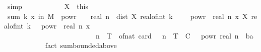 \begin{isabellebody}
\ simp\isanewline
\ \ \ \ \ \ \ \ \isacommand{{\isacharbraceright}{\kern0pt}}\isamarkupfalse%
\ \isamarkupfalse%
\ X\ {\isacharequal}{\kern0pt}\ this\isanewline
\ \ \ \ \ \ \ \ \isamarkupfalse%
\ \isamarkupfalse%
\ {\isachardoublequoteopen}sum\ {\isacharparenleft}{\kern0pt}{\isasymlambda}k{\isachardot}{\kern0pt}\ {\isasymP}{\isacharparenleft}{\kern0pt}x\ in\ {\isacharquery}{\kern0pt}M{\isachardot}{\kern0pt}\ {}\ powr\ {\isacharparenleft}{\kern0pt}{\isacharminus}{\kern0pt}\ {\isasymgamma}\ {\isacharasterisk}{\kern0pt}\ real\ n{\isacharparenright}{\kern0pt}\ {\isasymle}\ dist\ {\isacharparenleft}{\kern0pt}X\ {\isacharparenleft}{\kern0pt}real{\isacharunderscore}{\kern0pt}of{\isacharunderscore}{\kern0pt}int\ {\isacharparenleft}{\kern0pt}k\ {\isacharminus}{\kern0pt}\ {}{\isacharparenright}{\kern0pt}\ {\isacharasterisk}{\kern0pt}\ {}\ powr\ {\isacharminus}{\kern0pt}\ real\ n{\isacharparenright}{\kern0pt}\ x{\isacharparenright}{\kern0pt}\ {\isacharparenleft}{\kern0pt}X\ {\isacharparenleft}{\kern0pt}real{\isacharunderscore}{\kern0pt}of{\isacharunderscore}{\kern0pt}int\ k\ {\isacharasterisk}{\kern0pt}\ {}\ powr\ {\isacharminus}{\kern0pt}\ real\ n{\isacharparenright}{\kern0pt}\ x{\isacharparenright}{\kern0pt}{\isacharparenright}{\kern0pt}{\isacharparenright}{\kern0pt}\ \isanewline
\ \ \ \ \ \ \ \ \ \ \ \ \ \ \ \ \ \ \ \ \ \ \ \ {\isacharbraceleft}{\kern0pt}{}{\isachardot}{\kern0pt}{\isachardot}{\kern0pt}{\isasymlfloor}{}\ {\isacharcircum}{\kern0pt}\ n\ {\isacharasterisk}{\kern0pt}\ T{\isasymrfloor}{\isacharbraceright}{\kern0pt}\ {\isasymle}\ of{\isacharunderscore}{\kern0pt}nat\ {\isacharparenleft}{\kern0pt}card\ {\isacharbraceleft}{\kern0pt}{}{\isachardot}{\kern0pt}{\isachardot}{\kern0pt}{\isasymlfloor}{}\ {\isacharcircum}{\kern0pt}\ n\ {\isacharasterisk}{\kern0pt}\ T{\isasymrfloor}{\isacharbraceright}{\kern0pt}{\isacharparenright}{\kern0pt}\ {\isacharasterisk}{\kern0pt}\ {\isacharparenleft}{\kern0pt}C\ {\isacharasterisk}{\kern0pt}\ {}\ powr\ {\isacharparenleft}{\kern0pt}{\isacharminus}{\kern0pt}{\isacharparenleft}{\kern0pt}real\ n{\isacharparenright}{\kern0pt}\ {\isacharasterisk}{\kern0pt}\ {\isacharparenleft}{\kern0pt}{}{\isacharplus}{\kern0pt}b{\isacharminus}{\kern0pt}a{\isacharasterisk}{\kern0pt}{\isasymgamma}{\isacharparenright}{\kern0pt}{\isacharparenright}{\kern0pt}{\isacharparenright}{\kern0pt}{\isachardoublequoteclose}\isanewline
\ \ \ \ \ \ \ \ \ \ \isamarkupfalse%
\ {\isacharparenleft}{\kern0pt}fact\ sum{\isacharunderscore}{\kern0pt}bounded{\isacharunderscore}{\kern0pt}above{\isacharparenright}{\kern0pt}\isanewline

\end{isabellebody}
